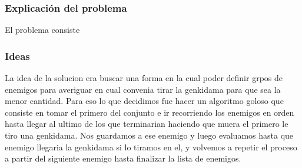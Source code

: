 \subsubsection{Explicación del problema}
El problema consiste 

\subsubsection{Ideas}
La idea de la solucion era buscar una forma en la cual poder definir grpos de enemigos para averiguar en cual convenia tirar la genkidama para que sea la menor cantidad.
Para eso lo que decidimos fue hacer un algoritmo goloso que consiste en tomar el primero del conjunto e ir recorriendo los enemigos en orden hasta llegar al ultimo de los que terminarian haciendo que muera el primero le tiro una genkidama. Nos guardamos a ese enemigo y luego evaluamos hasta que enemigo llegaria la genkidama si lo tiramos en el, y volvemos a repetir el proceso a partir del siguiente enemigo hasta finalizar la lista de enemigos.


